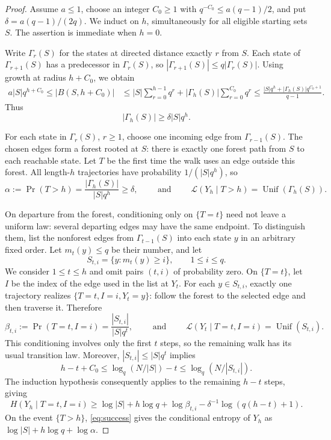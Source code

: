 \documentclass[10pt,a4paper]{amsart}
\begin{document}
\begin{proof}
Assume $a\le1$, choose an integer $C_0\ge1$ with
$q^{-C_0}\le a(q-1)/2$, and put $\delta=a(q-1)/(2q)$.
We induct on $h$, simultaneously for all eligible starting sets $S$.
The assertion is immediate when $h=0$.

Write $\Gamma_r(S)$ for the states at directed distance exactly $r$
from $S$. Each state of $\Gamma_{r+1}(S)$ has a predecessor in
$\Gamma_r(S)$, so $|\Gamma_{r+1}(S)|\le q|\Gamma_r(S)|$.
Using growth at radius $h+C_0$, we obtain
\[
 \begin{aligned}
 a|S|q^{h+C_0} \le |B(S,h+C_0)| 
 &\le |S|\sum_{r=0}^{h-1}q^r
       +|\Gamma_h(S)|\sum_{r=0}^{C_0}q^r \le\frac{|S|q^h+|\Gamma_h(S)|q^{C_0+1}}{q-1}.
 \end{aligned}
\]
Thus
\begin{equation}\label{eq:layer}
 |\Gamma_h(S)|\ge\delta|S|q^h.
\end{equation}

For each state in $\Gamma_r(S)$, $r\ge1$, choose one incoming edge
from $\Gamma_{r-1}(S)$. The chosen edges form a forest rooted at $S$:
there is exactly one forest path from $S$ to each reachable state.
Let $T$ be the first time the walk uses an edge outside this forest.
All length-$h$ trajectories have probability $1/(|S|q^h)$, so
\begin{equation}\label{eq:success}
 \alpha :=\Pr(T>h)=\frac{|\Gamma_h(S)|}{|S|q^h}\ge\delta,
 \qquad \text{ and } \qquad
 \mathcal L(Y_h\mid T>h)=\operatorname{Unif}(\Gamma_h(S)).
\end{equation}

On departure from the forest, conditioning only on $\{T=t\}$ need not
leave a uniform law: several departing edges may have the same
endpoint. To distinguish them, list the nonforest edges from
$\Gamma_{t-1}(S)$ into each state $y$ in an arbitrary fixed order.
Let $m_t(y)\le q$ be their number, and let
\[
 S_{t,i}=\{y:m_t(y)\ge i\},\qquad 1\le i\le q.
\]
We consider $1\le t\le h$ and omit pairs $(t,i)$ of probability zero.
On $\{T=t\}$, let $I$ be the index of the edge used in the list at
$Y_t$. For each $y\in S_{t,i}$, exactly one trajectory realizes
$\{T=t,I=i,Y_t=y\}$: follow the forest to the selected edge and
then traverse it. Therefore
\begin{equation}\label{eq:branch}
 \beta_{t,i}:=\Pr(T=t,I=i)=\frac{|S_{t,i}|}{|S|q^t},
 \qquad \text{ and } \qquad
 \mathcal L(Y_t\mid T=t,I=i)=\operatorname{Unif}(S_{t,i}).
\end{equation}
This conditioning involves only the first
$t$ steps, so the remaining walk has its usual transition law.
Moreover, $|S_{t,i}|\le|S|q^t$ implies
\[
 h-t+C_0\le\log_q(N/|S|)-t\le\log_q(N/|S_{t,i}|).
\]
The induction hypothesis consequently applies to the remaining
$h-t$ steps, giving
\[
 H(Y_h\mid T=t,I=i)
 \ge \log|S|+h\log q+\log\beta_{t,i}
      -\delta^{-1}\log(q(h-t)+1).
\]
On the event $\{T>h\}$, \eqref{eq:success} gives the conditional entropy of $Y_h$ as
$\log|S|+h\log q+\log\alpha$.


\end{proof}
\end{document}
